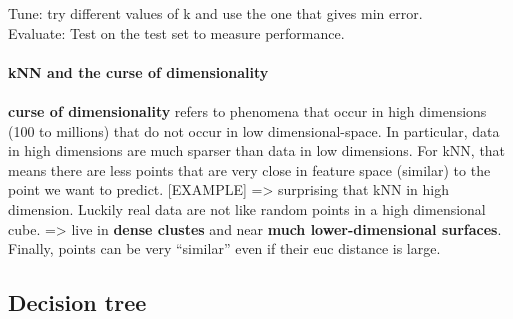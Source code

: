 Tune: try different values of k and use the one that gives min error. \\
Evaluate: Test on the test set to measure performance. \\\\
\textbf{kNN and the curse of dimensionality} 
\\\\
\textbf{curse of dimensionality} refers to phenomena that occur in high dimensions (100 to millions) that do not occur in low dimensional-space. In particular, data in high dimensions are much sparser than data in low dimensions. For kNN, that means there are less points that are very close in feature space (similar) to the point we want to predict. [EXAMPLE] => surprising that kNN in high dimension. Luckily real data are not like random points in a high dimensional cube. => live in \textbf{dense clustes} and near \textbf{much lower-dimensional surfaces}. Finally, points can be very ``similar'' even if their euc distance is large.

\subsection{Decision tree}

